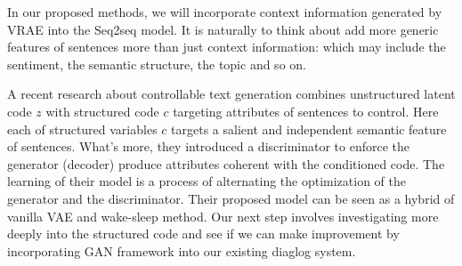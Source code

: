 In our proposed methods, we will incorporate context information generated by VRAE into the Seq2seq model. It is naturally to think about add more generic features of sentences more than just context information: which may include the sentiment, the semantic structure, the topic and so on.

A recent research about controllable text generation \cite{hu2017controllable} combines unstructured latent code $z$ with structured code $c$ targeting attributes of sentences to control. Here each of structured variables $c$ targets a salient and independent semantic feature of sentences. What's more, they introduced a discriminator to enforce the generator (decoder)  produce attributes coherent with the conditioned code. The learning of their model is a process of alternating the optimization of the generator and the discriminator. Their proposed model can be seen as a hybrid of vanilla VAE and wake-sleep method. Our next step involves investigating more deeply into the structured code and see if we can make improvement by incorporating GAN framework into our existing diaglog system. 
